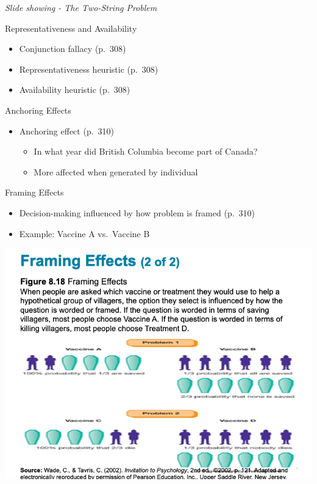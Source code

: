 \documentclass[
]{book}
\providecommand{\tightlist}{%
  \setlength{\itemsep}{0pt}\setlength{\parskip}{0pt}}
\begin{document}
\begin{reflect}
\emph{Slide showing - The Two-String Problem}

Representativeness and Availability

\begin{itemize}
\tightlist
\item
  Conjunction fallacy (p.~308)\\
\item
  Representativeness heuristic (p.~308)\\
\item
  Availability heuristic (p.~308)
\end{itemize}

Anchoring Effects

\begin{itemize}
\tightlist
\item
  Anchoring effect (p.~310)

  \begin{itemize}
  \tightlist
  \item
    In what year did British Columbia become part of Canada?\\
  \item
    More affected when generated by individual
  \end{itemize}
\end{itemize}

Framing Effects

\begin{itemize}
\tightlist
\item
  Decision-making influenced by how problem is framed (p.~310)\\
\item
  Example: Vaccine A vs.~Vaccine B
\end{itemize}

\includegraphics{assets/unit_1/slide_63.png}


\end{reflect}
\end{document}
